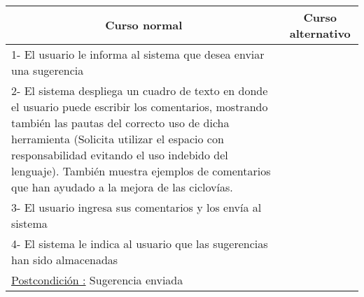 ~

\begin{center}
    \centering
    \begin{tabular}{ | p{11cm} | p{6cm} | }
    	\multicolumn{1}{c}{\cellcolor{black!30}\textbf{Curso normal}} & 
    	\multicolumn{1}{c}{\cellcolor{black!30}\textbf{Curso alternativo}} \\
		\hline
		1- El usuario le informa al sistema que desea enviar una sugerencia & \\ \hline
		2- El sistema despliega un cuadro de texto en donde el usuario puede escribir los comentarios,
		mostrando también las pautas del correcto uso de dicha herramienta (Solicita
		utilizar el espacio con
		responsabilidad evitando el uso indebido del lenguaje).
		También muestra ejemplos de comentarios que han ayudado a la mejora de las ciclovías. & \\ \hline
		3- El usuario ingresa sus comentarios y los envía al sistema & \\ \hline
		4- El sistema le indica al usuario que las sugerencias han sido almacenadas & \\ \hline
		\underline{Postcondición :} Sugerencia enviada & \\ \hline
    \end{tabular}
\end{center}




